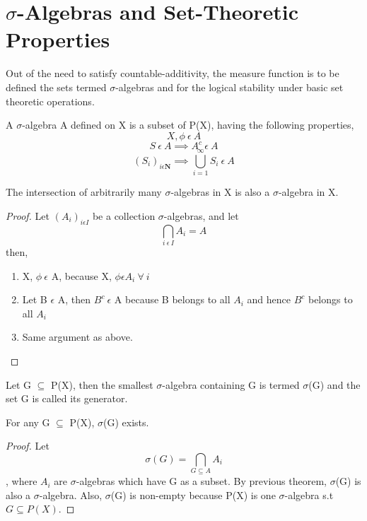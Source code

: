 \section{$\sigma$-Algebras and Set-Theoretic Properties}
Out of the need to satisfy countable-additivity, the measure function is to be
defined the sets termed $\sigma$-algebras and for the logical stability under
basic set theoretic operations.
\begin{definition}
    A $\sigma$-algebra A defined on X is a subset of P(X), having the following
    properties,
    \[
        X,\phi\:\epsilon\:A
    \]
    \[
        S\:\epsilon\:A \implies A^c \: \epsilon \: A
    \]    
    \[
        (S_i)_{i\epsilon\bm{N}} \implies \bigcup_{i=1}^{\infty} S_{i} \:
        \epsilon \: A
    \]
\end{definition}

\begin{theorem}
    The intersection of arbitrarily many $\sigma$-algebras in X is also a
    $\sigma$-algebra in X.
\end{theorem}
\begin{proof}
    Let $(A_i)_{i \epsilon I}$ be a collection $\sigma$-algebras, and let
    \[
        \bigcap_{i \: \epsilon \: I}A_i = A
    \]
    then,
    \begin{enumerate}
        \item X, $\phi \: \epsilon$ A, because X, $\phi \epsilon A_i \: \forall
            \: i$
        \item Let B $\epsilon$ A, then $B^c \: \epsilon$ A because B belongs to
            all $A_i$ and hence $B^c$ belongs to all $A_i$
        \item Same argument as above.
    \end{enumerate}
\end{proof}
\begin{definition}
    Let G $\subseteq$ P(X), then the smallest $\sigma$-algebra containing G is
    termed $\sigma$(G) and the set G is called its generator.
\end{definition}
\begin{theorem}
    For any G $\subseteq$ P(X), $\sigma$(G) exists.
\end{theorem}
\begin{proof}
    Let 
    \[
        \sigma(G) = \bigcap_{G \subseteq A} A_i
    \]
    , where $A_i$ are $\sigma$-algebras which have G as a subset. By previous
    theorem, $\sigma$(G) is also a $\sigma$-algebra. Also, $\sigma$(G) is
    non-empty because P(X) is one $\sigma$-algebra s.t $G \subseteq P(X)$.
\end{proof}

